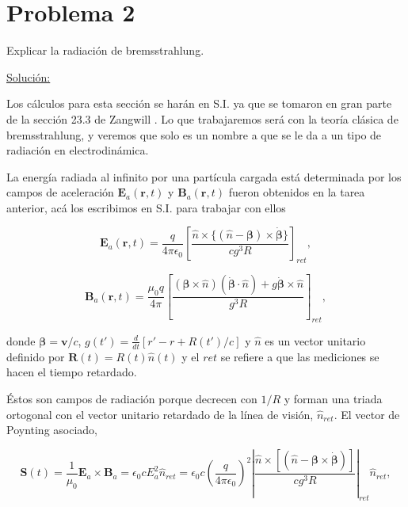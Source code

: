 \documentclass[a4paper,11pt]{article}
\numberwithin{equation}{section}
\begin{document}
\newpage

\section{Problema 2}

Explicar la radiación de bremsstrahlung.

\vspace{.3cm} \underline{Solución:} \vspace{.3cm}

Los cálculos para esta sección se harán en S.I. ya que se tomaron en gran parte
de la sección 23.3 de Zangwill \cite{zangwill}. Lo que trabajaremos será con 
la teoría clásica de bremsstrahlung, y veremos que solo es un nombre a que se 
le da a un tipo de radiación en electrodinámica.

\vspace{.3cm}

La energía radiada al infinito por una partícula cargada está determinada por 
los campos de aceleración $\mathbf{E}_a(\mathbf{r},t)$ y $\mathbf{B}_a(\mathbf{r},t)$ 
fueron obtenidos en la tarea anterior, acá los escribimos en S.I. para trabajar con 
ellos 

\begin{equation}
 \mathbf{E}_a(\mathbf{r},t) = \frac{q}{4\pi\epsilon_0}\left[\frac{\hat{n} 
 \times \{(\hat{n} - \pmb{\beta}) \times \dot{\pmb{\beta}} \}}{cg^3R} \right]_{ret},
\end{equation}

\begin{equation}
 \mathbf{B}_a(\mathbf{r},t) = \frac{\mu_0q}{4\pi}\left[\frac{(\pmb{\beta} \times 
 \hat{n})(\dot{\pmb{\beta}} \cdot \hat{n}) + g\dot{\pmb{\beta}} 
 \times \hat{n}}{g^3R} \right]_{ret},
\end{equation}

donde $\pmb{\beta} = \mathbf{v}/c$, $g(t') = \frac{d}{dt}[r' - r + R(t')/c]$ y 
$\hat{n}$ es un vector unitario definido por $\mathbf{R}(t) = R(t)\hat{n}(t)$ y 
el $ret$ se refiere a que las mediciones se hacen el tiempo retardado. 

\vspace{.3cm}

Éstos son campos de radiación porque decrecen con $1/R$ y forman una triada 
ortogonal con el vector unitario retardado de la línea de visión, $\hat{n}_{ret}$. 
El vector de Poynting asociado, 

\begin{equation}
 \mathbf{S}(t) = \frac{1}{\mu_0}\mathbf{E}_a \times \mathbf{B}_a = 
 \epsilon_0cE_{a}^2 \hat{n}_{ret} = \epsilon_0c\left(\frac{q}{4\pi\epsilon_0}\right)^2 
 \left|\frac{\hat{n} \times [(\hat{n} - 
 \pmb{\beta} \times \dot{\pmb{\beta}})]}{cg^3R}\right|_{ret} \hat{n}_{ret}, 
\end{equation}
\end{document}
